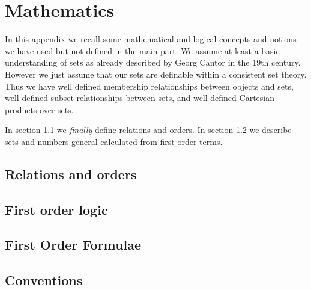 



\chapter{Mathematics}



In this appendix we recall some mathematical and logical concepts and notions 
we have used but not defined in the main part.
We assume at least a {\myem basic} understanding of sets as already 
described by Georg Cantor in the 19th century. 
However we just assume that our sets are definable within a consistent set theory.
Thus we have well defined {\myem membership} relationships between objects and sets,
well defined {\myem subset} relationships between sets, 
and well defined {\myem Cartesian products} over sets.

In section \ref{sec:app:maths} we {\em finally} define {\myem relations} and {\myem orders}. 
In section \ref{sec:app:fol} we describe sets and numbers general calculated from first order terms.



\section{Relations and orders}\label{sec:app:maths}



\section{First order logic}\label{sec:app:fol}






\section{First Order Formulae}






\section{Conventions}



